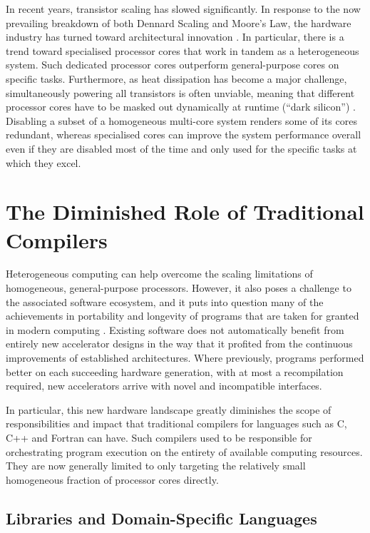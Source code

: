     In recent years, transistor scaling has slowed significantly.
    In response to the now prevailing breakdown of both Dennard Scaling and
    Moore's Law, the hardware industry has turned toward architectural
    innovation \citep{7878935}.
    In particular, there is a trend toward specialised processor cores that work
    in tandem as a heterogeneous system.
    Such dedicated processor cores outperform general-purpose cores on
    specific tasks.
    Furthermore, as heat dissipation has become a major challenge,
    simultaneously powering all transistors is often unviable, meaning that
    different processor cores have to be masked out dynamically at runtime
    (``dark silicon'') \citep{6307773}.
    Disabling a subset of a homogeneous multi-core system renders some of its
    cores redundant, whereas specialised cores can improve the system
    performance overall even if they are disabled most of the time and only
    used for the specific tasks at which they excel.

\section{The Diminished Role of Traditional Compilers}

    Heterogeneous computing can help overcome the scaling limitations of
    homogeneous, general-purpose processors.
    However, it also poses a challenge to the associated software ecosystem, and
    it puts into question many of the achievements in portability and longevity
    of programs that are taken for granted in modern computing \citep{8719512}.
    Existing software does not automatically benefit from entirely new
    accelerator designs in the way that it profited from the continuous
    improvements of established architectures.
    Where previously, programs performed better on each succeeding hardware
    generation, with at most a recompilation required, new accelerators arrive
    with novel and incompatible interfaces.

    In particular, this new hardware landscape greatly diminishes the scope of
    responsibilities and impact that traditional compilers for languages such as
    C, C++ and Fortran can have.
    Such compilers used to be responsible for orchestrating
    program execution on the entirety of available computing resources.
    They are now generally limited to only targeting the relatively small
    homogeneous fraction of processor cores directly.

\subsection{Libraries and Domain-Specific Languages}

